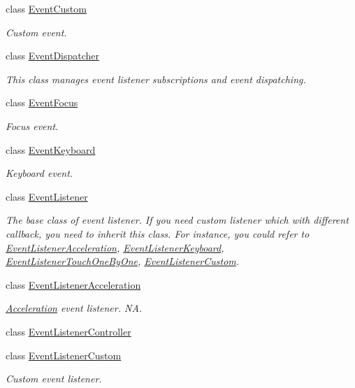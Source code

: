 \begin{DoxyCompactItemize}
class \hyperlink{classEventCustom}{Event\+Custom}
\begin{DoxyCompactList}\small\item\em Custom event. \end{DoxyCompactList}\item 
class \hyperlink{classEventDispatcher}{Event\+Dispatcher}
\begin{DoxyCompactList}\small\item\em This class manages event listener subscriptions and event dispatching. \end{DoxyCompactList}\item 
class \hyperlink{classEventFocus}{Event\+Focus}
\begin{DoxyCompactList}\small\item\em Focus event. \end{DoxyCompactList}\item 
class \hyperlink{classEventKeyboard}{Event\+Keyboard}
\begin{DoxyCompactList}\small\item\em Keyboard event. \end{DoxyCompactList}\item 
class \hyperlink{classEventListener}{Event\+Listener}
\begin{DoxyCompactList}\small\item\em The base class of event listener. If you need custom listener which with different callback, you need to inherit this class. For instance, you could refer to \hyperlink{classEventListenerAcceleration}{Event\+Listener\+Acceleration}, \hyperlink{classEventListenerKeyboard}{Event\+Listener\+Keyboard}, \hyperlink{classEventListenerTouchOneByOne}{Event\+Listener\+Touch\+One\+By\+One}, \hyperlink{classEventListenerCustom}{Event\+Listener\+Custom}. \end{DoxyCompactList}\item 
class \hyperlink{classEventListenerAcceleration}{Event\+Listener\+Acceleration}
\begin{DoxyCompactList}\small\item\em \hyperlink{classAcceleration}{Acceleration} event listener.  NA. \end{DoxyCompactList}\item 
class \hyperlink{classEventListenerController}{Event\+Listener\+Controller}
\item 
class \hyperlink{classEventListenerCustom}{Event\+Listener\+Custom}
\begin{DoxyCompactList}\small\item\em Custom event listener. \end{DoxyCompactList}\item 

\end{DoxyCompactItemize}
